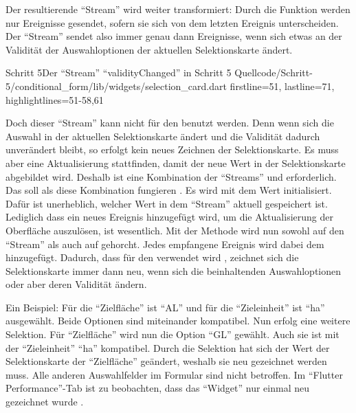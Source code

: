 Der resultierende \enquote{Stream} wird weiter transformiert: Durch die Funktion   werden nur Ereignisse gesendet,
sofern sie sich von dem letzten Ereignis unterscheiden.
Der \enquote{Stream}  sendet also immer genau dann Ereignisse,
wenn sich etwas an der Validität der Auswahloptionen der aktuellen Selektionskarte ändert.

\begin{alexlisting}{Schritt 5}{Der \enquote{Stream} \enquote{validityChanged} in Schritt 5}
  {Quellcode/Schritt-5/conditional_form/lib/widgets/selection_card.dart}
  {firstline=51, lastline=71, highlightlines={51-58,61}}
  \label{lst:Schritt5needsRepaint}
\end{alexlisting} 

Doch dieser \enquote{Stream} kann nicht für den  benutzt werden.
Denn wenn sich die Auswahl in der aktuellen Selektionskarte ändert
und die Validität dadurch unverändert bleibt,
so erfolgt kein neues Zeichnen der Selektionskarte.
Es muss aber eine Aktualisierung stattfinden, damit der neue Wert in der Selektionskarte abgebildet wird.
Deshalb ist eine Kombination der \enquote{Streams}  und  erforderlich.
Das   soll als diese Kombination fungieren .
Es wird mit dem Wert  initialisiert.
Dafür ist unerheblich, welcher Wert in dem \enquote{Stream} aktuell gespeichert ist. 
Lediglich dass ein neues Ereignis hinzugefügt wird,
um die Aktualisierung der Oberfläche auszulösen,
ist wesentlich.
Mit der Methode  wird nun sowohl auf den \enquote{Stream}   als auch auf   gehorcht. 
Jedes empfangene Ereignis wird dabei dem   hinzugefügt.
Dadurch,
dass  für den  verwendet wird ,
zeichnet sich die Selektionskarte immer dann neu,
wenn sich die beinhaltenden Auswahloptionen oder aber deren Validität ändern.


Ein Beispiel:
Für die \enquote{Zielfläche} ist \enquote{AL} und für die \enquote{Zieleinheit} ist \enquote{ha} ausgewählt.
Beide Optionen sind miteinander kompatibel.
Nun erfolg eine weitere Selektion.
Für \enquote{Zielfläche} wird nun die Option \enquote{GL} gewählt.
Auch sie ist mit der \enquote{Zieleinheit} \enquote{ha} kompatibel.
Durch die Selektion hat sich der Wert der Selektionskarte der \enquote{Zielfläche} geändert, weshalb sie neu gezeichnet werden muss.
Alle anderen Auswahlfelder im Formular sind nicht betroffen.
Im \enquote{Flutter Performance}-Tab ist zu beobachten,
dass das \enquote{Widget}  nur einmal neu gezeichnet wurde \Abb{\ref{fig:Schritt5_1rebuild}}.

